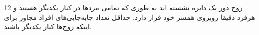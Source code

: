 12 زوج دور یک دایره نشسته اند به طوری که تمامی مردها در کنار یکدیگر هستند و 
هرفرد دقیقا روبروی همسر خود قرار دارد. حداقل تعداد جابه‌جایی‌های افراد مجاور برای اینکه زوج‌ها کنار یکدیگر باشند.